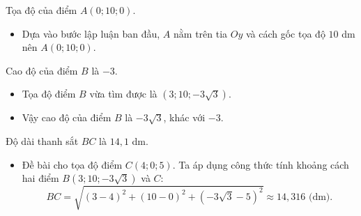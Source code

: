 \begin{ex}[]
{\begin{itemchoice}
			\itemch Tọa độ của điểm $A(0;10;0)$.
			\begin{itemize}
				\item Dựa vào bước lập luận ban đầu, $A$ nằm trên tia $Oy$ và cách gốc tọa độ $10$ dm nên $A(0; 10; 0)$.
			\end{itemize}
			
			\itemch Cao độ của điểm $B$ là $-3$.
			\begin{itemize}
				\item Tọa độ điểm $B$ vừa tìm được là $(3; 10; -3\sqrt{3})$.
				\item Vậy cao độ của điểm $B$ là $-3\sqrt{3}$, khác với $-3$.
			\end{itemize}
			
			\itemch Độ dài thanh sắt $BC$ là $14{,}1$ dm.
			\begin{itemize}
				\item Đề bài cho tọa độ điểm $C(4; 0; 5)$. Ta áp dụng công thức tính khoảng cách hai điểm $B(3; 10; -3\sqrt{3})$ và $C$:
				$$BC = \sqrt{(3-4)^2 + (10-0)^2 + (-3\sqrt{3}-5)^2}\approx 14{,}316 \text{ (dm).} $$
			\end{itemize}
		\end{itemchoice}
	}
\end{ex}

